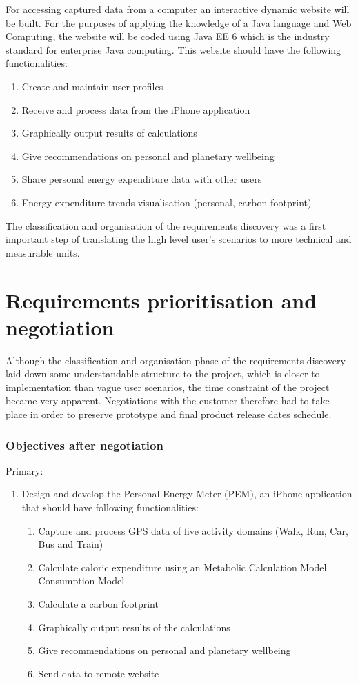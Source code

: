 \documentclass[12pt, a4paper]{report}   %
\begin{document}
\begin{enumerate}
For accessing captured data from a computer an interactive dynamic website will be built. For the purposes of applying the knowledge of a Java language and Web Computing, the website will be coded using Java EE 6 which is the industry standard for enterprise Java computing. This website should have the following functionalities:
\begin{enumerate}
\item Create and maintain user profiles
\item Receive and process data from the iPhone application
\item Graphically output results of calculations
\item Give recommendations on personal and planetary wellbeing
\item Share personal energy expenditure data with other users
\item Energy expenditure trends visualisation (personal, carbon footprint)
\end{enumerate}
The classification and organisation of the requirements discovery was a first important step of translating the high level user's scenarios to more technical and measurable units.

\section{Requirements prioritisation and \\ negotiation}
Although the classification and organisation phase of the requirements discovery laid down some understandable structure to the project, which is closer to implementation than vague user scenarios, the time constraint of the project became very apparent. Negotiations with the customer therefore had to take place in order to preserve prototype and final product release dates schedule.

\subsubsection*{Objectives after negotiation}
Primary:
	\begin{enumerate}
		\item Design and develop the Personal Energy Meter (PEM), an iPhone application that 		should 	have following functionalities:
		\begin{enumerate}
			\item Capture and process GPS data of five activity domains (Walk, Run, Car, Bus and Train)
			\item Calculate caloric expenditure using an Metabolic Calculation Model Consumption Model
			\item Calculate a carbon footprint
			\item Graphically output results of the calculations
			\item Give recommendations on personal and planetary wellbeing
			\item Send data to remote website
		\end{enumerate}
		

\end{enumerate}
\end{enumerate}
\end{document}
